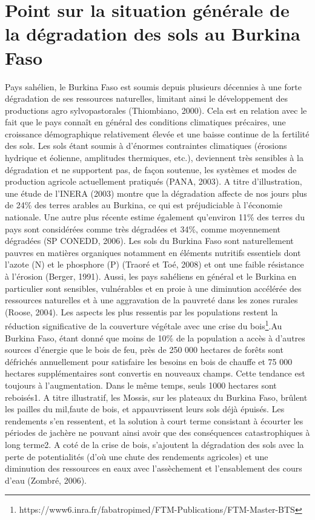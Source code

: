 \documentclass[a4paper,11pt]{article}
\begin{document}
\section{Point sur la situation générale de la dégradation des sols au Burkina Faso}

Pays sahélien, le Burkina Faso est soumis depuis plusieurs décennies à
une forte dégradation de ses ressources naturelles, limitant ainsi le
développement des productions agro sylvopastorales (Thiombiano,
2000). Cela est en relation avec le fait que le pays connaît en
général des conditions climatiques précaires, une croissance
démographique relativement élevée et une baisse continue de la
fertilité des sols. Les sols étant soumis à d’énormes contraintes
climatiques (érosions hydrique et éolienne, amplitudes thermiques,
etc.), deviennent très sensibles à la dégradation et ne supportent
pas, de façon soutenue, les systèmes et modes de production agricole
actuellement pratiqués (PANA, 2003). A titre d’illustration, une étude
de l’INERA (2003) montre que la dégradation affecte de nos jours plus
de 24\% des terres arables au Burkina, ce qui est préjudiciable à
l’économie nationale. Une autre plus récente estime également
qu’environ 11\% des terres du pays sont considérées comme très
dégradées et 34\%, comme moyennement dégradées (SP CONEDD, 2006).  Les
sols du Burkina Faso sont naturellement pauvres en matières organiques
notamment en éléments nutritifs essentiels dont l’azote (N) et le
phosphore (P) (Traoré et Toé, 2008) et ont une faible résistance à
l’érosion (Berger, 1991). Aussi, les pays sahéliens en général et le
Burkina en particulier sont sensibles, vulnérables et en proie à une
diminution accélérée des ressources naturelles et à une aggravation de
la pauvreté dans les zones rurales (Roose, 2004). Les aspects les plus
ressentis par les populations restent la réduction significative de la
couverture végétale avec une crise du bois\footnote{https://www6.inra.fr/fabatropimed/FTM-Publications/FTM-Master-BTS}.Au Burkina Faso, étant donné que moins de 10\% de la population a accès à d’autres sources d’énergie que le bois de feu, près de 250 000 hectares de forêts sont défrichés annuellement pour satisfaire les besoins en bois de chauffe et 75 000 hectares supplémentaires sont convertis en nouveaux champs. Cette tendance est toujours à l’augmentation. Dans le même temps, seuls 1000 hectares sont reboisés1. A titre illustratif, les Mossis, sur les plateaux du Burkina Faso, brûlent les pailles du mil,faute de bois, et appauvrissent leurs sols déjà épuisés. Les rendements s’en ressentent, et la solution à court terme consistant à écourter les périodes de jachère ne pouvant ainsi avoir que des conséquences catastrophiques à long terme2. A coté de la crise de
bois, s’ajoutent la dégradation des sols avec la perte de
potentialités (d’où une chute des rendements agricoles) et une
diminution des ressources en eaux avec l’assèchement et l’ensablement
des cours d’eau (Zombré, 2006)\cite{Doggett_1988}.
\end{document}
